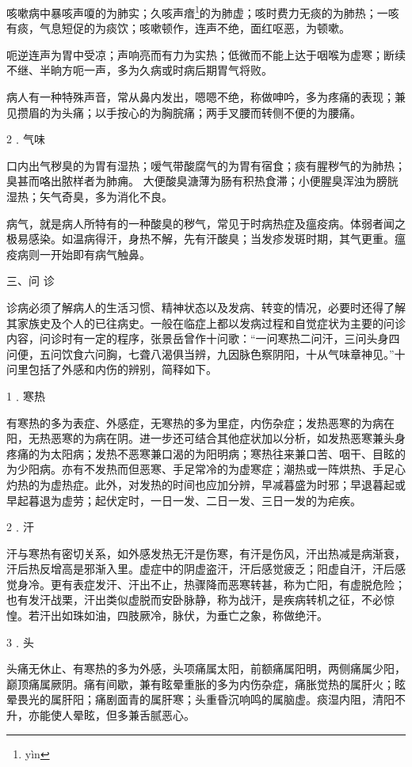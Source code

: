 \documentclass[a4paper,12pt,UTF8,twoside]{ctexbook}
\begin{document}
咳嗽病中暴咳声嗄的为肺实；久咳声瘖\footnote{y\`in}的为肺虚；咳时费力无痰的为肺热；一咳有痰，气息短促的为痰饮；咳嗽顿作，连声不绝，面红呕恶，为顿嗽。

呃逆连声为胃中受凉；声响亮而有力为实热；低微而不能上达于咽喉为虚寒；断续不继、半晌方呃一声，多为久病或时病后期胃气将败。

病人有一种特殊声音，常从鼻内发出，嗯嗯不绝，称做呻吟，多为疼痛的表现；兼见攒眉的为头痛；以手按心的为胸脘痛；两手叉腰而转侧不便的为腰痛。

2﹒气味

口内出气秽臭的为胃有湿热；嗳气带酸腐气的为胃有宿食；痰有腥秽气的为肺热；臭甚而咯出脓样者为肺痈。
大便酸臭溏薄为肠有积热食滞；小便腥臭浑浊为膀胱湿热；矢气奇臭，多为消化不良。

病气，就是病人所特有的一种酸臭的秽气，常见于时病热症及瘟疫病。体弱者闻之极易感染。如温病得汗，身热不解，先有汗酸臭；当发疹发斑时期，其气更重。瘟疫病则一开始即有病气触鼻。

三、问 诊

诊病必须了解病人的生活习惯、精神状态以及发病、转变的情况，必要时还得了解其家族史及个人的已往病史。一般在临症上都以发病过程和自觉症状为主要的问诊内容，问诊时有一定的程序，张景岳曾作十问歌：“一问寒热二问汗，三问头身四问便，五问饮食六问胸，七聋八渴俱当辨，九因脉色察阴阳，十从气味章神见。”十问里包括了外感和内伤的辨别，简释如下。

1﹒寒热

有寒热的多为表症、外感症，无寒热的多为里症，内伤杂症；发热恶寒的为病在阳，无热恶寒的为病在阴。进一步还可结合其他症状加以分析，如发热恶寒兼头身疼痛的为太阳病；发热不恶寒兼口渴的为阳明病；寒热往来兼口苦、咽干、目眩的为少阳病。亦有不发热而但恶寒、手足常冷的为虚寒症；潮热或一阵烘热、手足心灼热的为虚热症。此外，对发热的时间也应加分辨，早减暮盛为时邪；早退暮起或早起暮退为虚劳；起伏定时，一日一发、二日一发、三日一发的为疟疾。

2﹒汗

汗与寒热有密切关系，如外感发热无汗是伤寒，有汗是伤风，汗出热减是病渐衰，汗后热反增高是邪渐入里。虚症中的阴虚盗汗，汗后感觉疲乏；阳虚自汗，汗后感觉身冷。更有表症发汗、汗出不止，热骤降而恶寒转甚，称为亡阳，有虚脱危险；也有发汗战栗，汗出类似虚脱而安卧脉静，称为战汗，是疾病转机之征，不必惊惶。若汗出如珠如油，四肢厥冷，脉伏，为垂亡之象，称做绝汗。

3﹒头

头痛无休止、有寒热的多为外感，头项痛属太阳，前额痛属阳明，两侧痛属少阳，巅顶痛属厥阴。痛有间歇，兼有眩晕重胀的多为内伤杂症，痛胀觉热的属肝火；眩晕畏光的属肝阳；痛剧面青的属肝寒；头重昏沉响鸣的属脑虚。痰湿内阻，清阳不升，亦能使人晕眩，但多兼舌腻恶心。
\end{document}
